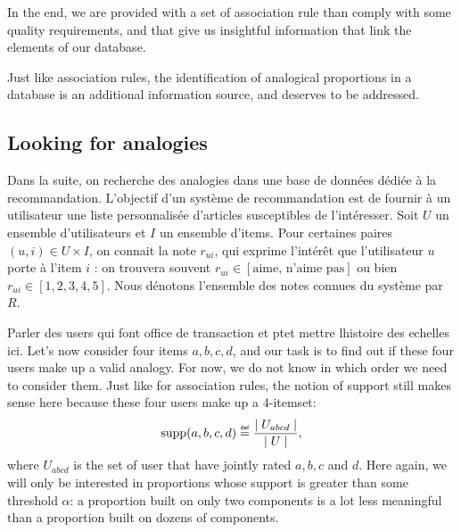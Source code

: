 In the end, we are provided with a set of association rule than comply with
some quality requirements, and that give us insightful information that link
the elements of our database.


Just like association rules, the identification of analogical proportions in a
database is an additional information source, and deserves to be addressed.


\subsection{Looking for analogies}


Dans la suite, on recherche des analogies dans une base de données dédiée à la
recommandation.
L'objectif d'un système de recommandation est de fournir à un utilisateur une
liste personnalisée d'articles susceptibles de l'intéresser.  Soit $U$ un
ensemble d'utilisateurs et $I$ un ensemble d'items. Pour certaines paires $(u,
i) \in U \times I$, on connait la note $r_{ui}$, qui exprime l'intérêt que
l'utilisateur $u$ porte à l'item $i$ : on trouvera souvent $r_{ui} \in
[\text{aime, n'aime pas}]$ ou bien $r_{ui} \in [1, 2, 3, 4, 5]$. Nous dénotons l'ensemble des notes
connues du système par $R$.

Parler des users qui font office de transaction et ptet mettre lhistoire des
echelles ici.
Let's now consider four items $a, b, c, d$, and our task is to find out if
these four users make up a valid analogy. For now, we do not know in which
order we need to consider them.  Just like for association rules, the notion of
support still makes sense here because these four users make up a $4$-itemset:
$$\supp(a, b, c, d) \eqdef \frac{\mid U_{abcd}\mid}{\mid U\mid},$$
where $U_{abcd}$ is the set of user that have jointly rated $a, b, c$ and $d$.
Here again, we will only be interested in proportions whose support is greater
than some threshold $\alpha$: a proportion built on only two components is a
lot less meaningful than a proportion built on dozens of components.

